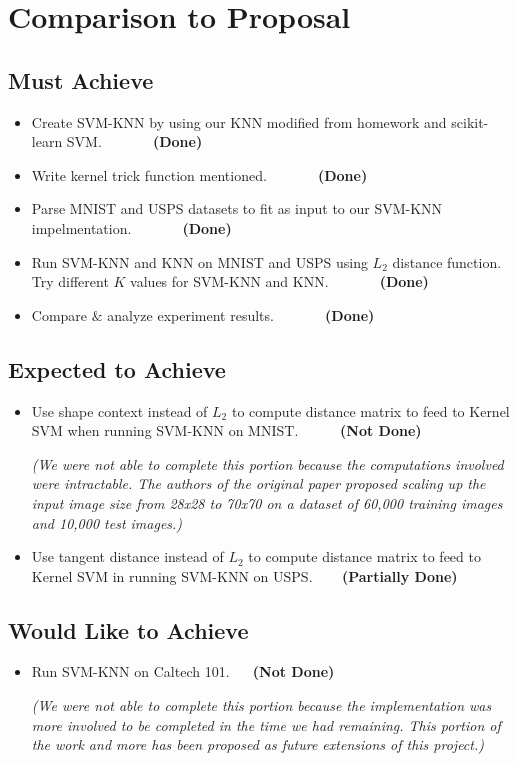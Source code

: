 \documentclass[11pt,letterpaper]{article}
\begin{document}
\section{Comparison to Proposal}

\subsection{Must Achieve}

\begin{itemize}
\item Create SVM-KNN by using our KNN modified from homework and scikit-learn SVM. $\>\>\>\>\>\>\>\>\>\>\>\>\>\>\>$\textbf{(Done)}
\item Write kernel trick function mentioned. $\>\>\>\>\>\>\>\>\>\>\>\>\>\>\>$\textbf{(Done)}
\item Parse MNIST and USPS datasets to fit as input to our SVM-KNN impelmentation. $\>\>\>\>\>\>\>\>\>\>\>\>\>\>\>$\textbf{(Done)}
\item Run SVM-KNN and KNN on MNIST and USPS using $L_2$ distance function. Try different $K$ values for SVM-KNN and KNN. $\>\>\>\>\>\>\>\>\>\>\>\>\>\>\>$\textbf{(Done)}
\item Compare $\&$ analyze experiment results. $\>\>\>\>\>\>\>\>\>\>\>\>\>\>\>$\textbf{(Done)}
\end{itemize}

\subsection{Expected to Achieve}
\begin{itemize}
\item Use shape context instead of $L_2$ to compute distance matrix to feed to Kernel SVM when running SVM-KNN on MNIST. $\>\>\>\>\>\>\>\>\>\>\>\>$\textbf{(Not Done)}

\textit{(We were not able to complete this portion because the computations involved were intractable. The authors of the original paper proposed scaling up the input image size from 28x28 to 70x70 on a dataset of 60,000 training images and 10,000 test images.)}
\item Use tangent distance instead of $L_2$ to compute distance matrix to feed to Kernel SVM in running SVM-KNN on USPS. $\>\>\>\>\>\>\>\>$\textbf{(Partially Done)}
\end{itemize}

\subsection{Would Like to Achieve}
\begin{itemize}
\item Run SVM-KNN on Caltech 101. $\>\>\>\>\>\>$\textbf{(Not Done)}

\textit{(We were not able to complete this portion because the implementation was more involved to be completed in the time we had remaining. This portion of the work and more has been proposed as future extensions of this project.)}
\end{itemize}
\end{document}
